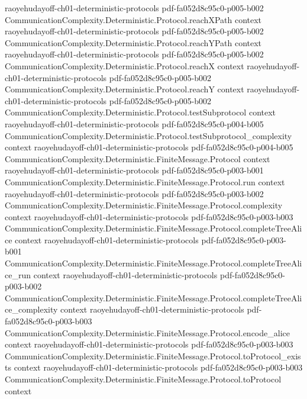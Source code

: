 \begin{theorem}
  {raoyehudayoff-ch01-deterministic-protocols}
  {pdf-fa052d8c95c0-p005-b002}
\proofstep
  {CommunicationComplexity.Deterministic.Protocol.reachXPath}
  {context}
  {raoyehudayoff-ch01-deterministic-protocols}
  {pdf-fa052d8c95c0-p005-b002}
\proofstep
  {CommunicationComplexity.Deterministic.Protocol.reachYPath}
  {context}
  {raoyehudayoff-ch01-deterministic-protocols}
  {pdf-fa052d8c95c0-p005-b002}
\proofstep
  {CommunicationComplexity.Deterministic.Protocol.reachX}
  {context}
  {raoyehudayoff-ch01-deterministic-protocols}
  {pdf-fa052d8c95c0-p005-b002}
\proofstep
  {CommunicationComplexity.Deterministic.Protocol.reachY}
  {context}
  {raoyehudayoff-ch01-deterministic-protocols}
  {pdf-fa052d8c95c0-p005-b002}
\proofstep
  {CommunicationComplexity.Deterministic.Protocol.testSubprotocol}
  {context}
  {raoyehudayoff-ch01-deterministic-protocols}
  {pdf-fa052d8c95c0-p004-b005}
\proofstep
  {CommunicationComplexity.Deterministic.Protocol.testSubprotocol_complexity}
  {context}
  {raoyehudayoff-ch01-deterministic-protocols}
  {pdf-fa052d8c95c0-p004-b005}
\proofstep
  {CommunicationComplexity.Deterministic.FiniteMessage.Protocol}
  {context}
  {raoyehudayoff-ch01-deterministic-protocols}
  {pdf-fa052d8c95c0-p003-b001}
\proofstep
  {CommunicationComplexity.Deterministic.FiniteMessage.Protocol.run}
  {context}
  {raoyehudayoff-ch01-deterministic-protocols}
  {pdf-fa052d8c95c0-p003-b002}
\proofstep
  {CommunicationComplexity.Deterministic.FiniteMessage.Protocol.complexity}
  {context}
  {raoyehudayoff-ch01-deterministic-protocols}
  {pdf-fa052d8c95c0-p003-b003}
\proofstep
  {CommunicationComplexity.Deterministic.FiniteMessage.Protocol.completeTreeAlice}
  {context}
  {raoyehudayoff-ch01-deterministic-protocols}
  {pdf-fa052d8c95c0-p003-b001}
\proofstep
  {CommunicationComplexity.Deterministic.FiniteMessage.Protocol.completeTreeAlice_run}
  {context}
  {raoyehudayoff-ch01-deterministic-protocols}
  {pdf-fa052d8c95c0-p003-b002}
\proofstep
  {CommunicationComplexity.Deterministic.FiniteMessage.Protocol.completeTreeAlice_complexity}
  {context}
  {raoyehudayoff-ch01-deterministic-protocols}
  {pdf-fa052d8c95c0-p003-b003}
\proofstep
  {CommunicationComplexity.Deterministic.FiniteMessage.Protocol.encode_alice}
  {context}
  {raoyehudayoff-ch01-deterministic-protocols}
  {pdf-fa052d8c95c0-p003-b003}
\proofstep
  {CommunicationComplexity.Deterministic.FiniteMessage.Protocol.toProtocol_exists}
  {context}
  {raoyehudayoff-ch01-deterministic-protocols}
  {pdf-fa052d8c95c0-p003-b003}
\proofstep
  {CommunicationComplexity.Deterministic.FiniteMessage.Protocol.toProtocol}
  {context}

\end{theorem}
